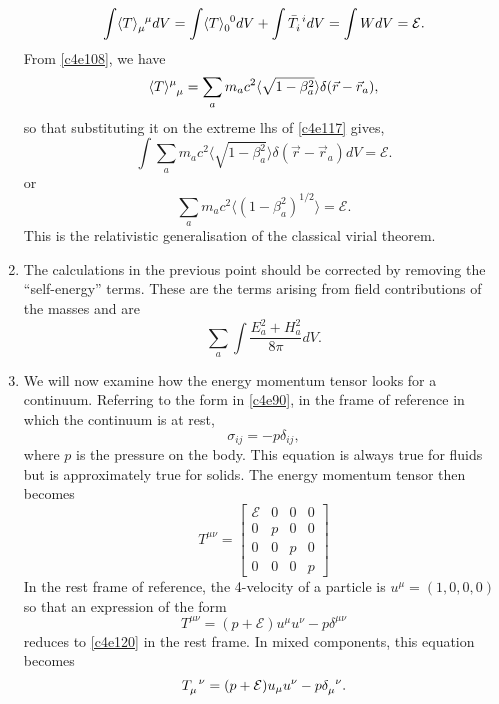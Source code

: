 \begin{enumerate}
\begin{equation}\label{c4e117}
\int \tensor{\langle T \rangle}{_\mu^\mu} dV = 
\int\tensor{\langle T \rangle}{_0^0} dV + \int\tensor{\bar{T}}{_i^i}dV =
\int WdV = \mathcal{E}.
\end{equation}
From \eqref{c4e108}, we have
\[
\tensor{\langle T \rangle}{^{\mu}_\mu} = 
\sum_a m_ac^2\langle\sqrt{1 - \beta_a^2}\rangle\delta(\vec{r} - \vec{r}_a),
\]
so that substituting it on the extreme lhs of \eqref{c4e117} gives,
\[
\int \sum_a m_ac^2
\langle\sqrt{1 - \beta_a^2}\rangle\delta(\vec{r} - \vec{r}_a) dV = \mathcal{E}.
\]
or
\begin{equation}\label{c4e118}
\sum_a m_ac^2\langle(1 - \beta_a^2)^{1/2}\rangle = \mathcal{E}.
\end{equation}
This is the relativistic generalisation of the classical virial theorem.

\item The calculations in the previous point should be corrected by removing the
``self-energy'' terms. These are the terms arising from field contributions of 
the masses and are
\[
\sum_a \int\frac{E_a^2 + H_a^2}{8\pi}dV.
\]

\item We will now examine how the energy momentum tensor looks for a continuum.
Referring to the form in \eqref{c4e90}, in the frame of reference in which the
continuum is at rest,
\begin{equation}\label{c4e119}
\sigma_{ij} = -p\delta_{ij},
\end{equation}
where $p$ is the pressure on the body. This equation is always true for fluids
but is approximately true for solids. The energy momentum tensor then becomes
\begin{equation}\label{c4e120}
T^{\mu\nu} = \begin{bmatrix}\mathcal{E} & 0 & 0 & 0 \\
0 & p & 0 & 0 \\
0 & 0 & p & 0 \\
0 & 0 & 0 & p
\end{bmatrix}
\end{equation}
In the rest frame of reference, the 4-velocity of a particle is $u^\mu = 
(1, 0, 0, 0)$ so that an expression of the form
\begin{equation}\label{c4e121}
T^{\mu\nu} = (p + \mathcal{E})u^\mu u^\nu - p\delta^{\mu\nu}
\end{equation} 
reduces to \eqref{c4e120} in the rest frame. In mixed components, this equation
becomes
\begin{equation}\label{c4e122}
\tensor{T}{_\mu^\nu} = (p + \mathcal{E})u_\mu u^\nu - 
p\tensor{\delta}{_\mu^\nu}.
\end{equation} 


\end{enumerate}
